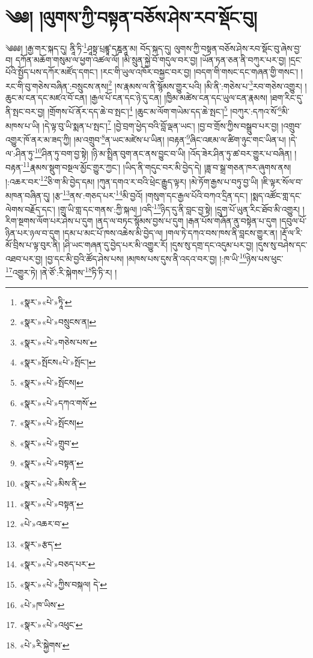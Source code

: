 \chapter{༄༅། །ལུགས་ཀྱི་བསྟན་བཅོས་ཤེས་རབ་སྡོང་བུ།}༄༅༅། །རྒྱ་གར་སྐད་དུ། ནཱི་ཏི་\footnote{«སྣར་»«པེ་»ཏཱི་}ཤཱསྟྲ་པྲཛྙཱ་དཎྜནཱ་མ། བོད་སྐད་དུ། ལུགས་ཀྱི་བསྟན་བཅོས་ཤེས་རབ་སྡོང་བུ་ཞེས་བྱ་བ། དཀོན་མཆོག་གསུམ་ལ་ཕྱག་འཚལ་ལོ། །མི་སྲུན་སྐྱེ་བོ་གདུལ་བར་བྱ། །ཡོན་ཏན་ཅན་ནི་བཀུར་པར་བྱ། །དྲང་པོའི་སྤྱོད་པས་དཀོར་མཛོད་དགང་། །རང་གི་ཡུལ་འཁོར་བསྐྱང་བར་བྱ། །བདག་གི་གསང་དང་གཞན་གྱི་གསང་། །རང་གི་བུ་གཅེས་བཞིན་:བསྲུངས་ནས།\footnote{«སྣར་»«པེ་»བསྲུངས་ན།} །ས་རྣམས་ལ་ནི་སྙོམས་གྱུར་པའི། །མི་ནི་:གཅེས་པ་\footnote{«སྣར་»«པེ་»གཅེས་པས་}རབ་གཅེས་འགྱུར། །ཆུང་མ་ངན་དང་མཛའ་བོ་ངན། །རྒྱལ་པོ་ངན་དང་ཉེ་དུ་ངན། །ཁྱིམ་མཚེས་ངན་དང་ཡུལ་ངན་རྣམས། །ཐག་རིང་དུ་ནི་སྤང་བར་བྱ། །གྲོགས་པོ་ནོར་དད་ཆེ་བ་སྤང་།\footnote{«སྣར་»སྤོངས«པེ་»སྤོང་།} །ཆུང་མ་ལོག་གཡེམ་དད་ཆེ་སྤང་།\footnote{«སྣར་»«པེ་»སྤོངས།} །བཀུར་:དཀའ་སོ་\footnote{«སྣར་»«པེ་»དཀའ་གསོ་}མི་མཁས་པ་ཡི། །དེ་ལྟ་བུ་ཡི་སྨན་པ་སྤང་།\footnote{«སྣར་»«པེ་»སྤོངས།} །བྱེ་བྲག་ཕྱེད་བའི་བློ་ལྡན་ཡང་། །བྱ་བ་གྲོས་ཀྱིས་བསྒྲུབ་པར་བྱ། །འགྲུབ་འགྱུར་ཁོ་ནར་མ་ཟད་ཀྱི། །མ་འགྲུབ་\footnote{«སྣར་»«པེ་»གྲུབ་}ན་ཡང་མཛེས་པ་ཡིན། །བརྟན་\footnote{«སྣར་»«པེ་»བསྟན་}ཞིང་འཇམ་ལ་ཚིག་ཉུང་གང་ཡིན་པ། །དེ་ལ་:ཤིན་ཏུ་\footnote{«སྣར་»«པེ་»མིས་ནི་}ཤིན་ཏུ་བག་བྱ་སྟེ། །ཉི་མ་སྤྲིན་བུག་ནང་ནས་བྱུང་བ་ཡི། །འོད་ཟེར་ཤིན་ཏུ་ཚ་བར་གྱུར་པ་བཞིན། །བརྟན་\footnote{«སྣར་»«པེ་»བསྟན་}རྣམས་སྡུག་བསྔལ་མྱོང་གྱུར་ཀྱང་། །ཡིད་ནི་གདུང་བར་མི་བྱེད་དེ། །ཟླ་བ་སྒྲ་གཅན་ཁར་ཞུགས་ནས། །:འཆར་བར་\footnote{«པེ་»འཆར་བ་}ཅི་ག་མི་བྱེད་དམ། །ཀུན་དགའ་ར་བའི་ཕྲེང་རྒྱུད་ལྟར། །མེ་ཏོག་རྒྱས་པ་བཏུ་བྱ་ཡི། །ཇི་ལྟར་སོལ་བ་མཁན་བཞིན་དུ། །རྩ་\footnote{«སྣར་»རྩད་}ནས་:གཅད་པར་\footnote{«སྣར་»«པེ་»བཅད་པར་}མི་བྱའོ། །གསུག་དང་རྒྱལ་པོའི་བཀའ་དྲིན་དང་། །སྨད་འཚོང་གླ་དང་ལེགས་བརྗོད་དང་། །གྲུ་ཡི་གླ་དང་གནས་:ཀྱི་སྐལ། །འདི་\footnote{«སྣར་»«པེ་»ཀྱིས་བསྐལ། དེ་}ཉིད་དུ་ནི་བླང་བྱ་སྟེ། །དྲུག་པོ་ཡུན་རིང་ཐོབ་མི་འགྱུར། །རིག་སྔགས་ལོག་པར་ཤེས་པ་དུག །ནད་ལ་བཏང་སྙོམས་བྱས་པ་དུག །རྒན་པོས་གཞོན་ནུ་བསྟེན་པ་དུག །དབུལ་པོ་ཉིན་པར་ཉལ་བ་དུག །དམ་པ་མང་པོ་ཁས་འཆེས་མི་བྱེད་ལ། །གལ་ཏེ་དཀའ་བས་ཁས་ནི་བླངས་གྱུར་ན། །རྡོ་ལ་རི་མོ་བྲིས་པ་ལྟ་བུར་ནི། །ཤི་ཡང་གཞན་དུ་བྱེད་པར་མི་འགྱུར་རོ། །དུས་སུ་དགྲ་དང་འདུམ་པར་བྱ། །དུས་སུ་བཤེས་དང་འཐབ་པར་བྱ། །བྱ་དང་མི་བྱའི་ཚོད་ཤེས་པས། །མཁས་པས་དུས་ནི་འདའ་བར་བྱ། །:ཁ་ཡི་\footnote{«པེ་»ཁ་ཡིས་}ཉེས་པས་ཕུང་\footnote{«སྣར་»«པེ་»འཕུང་}འགྱུར་ཏེ། །ནེ་ཙོ་:རི་སྐེགས་\footnote{«པེ་»རི་སྐྱེགས་}ཏི་ཏི་ར། །
